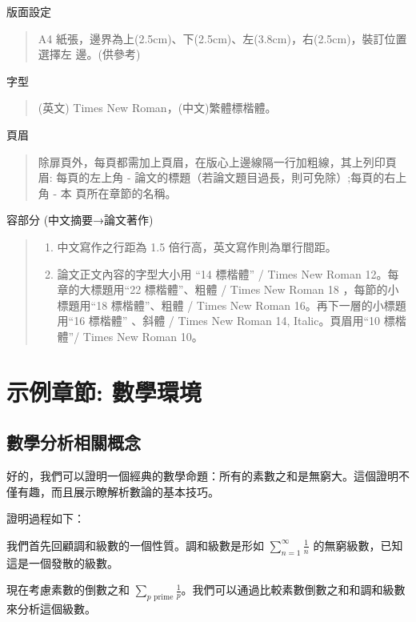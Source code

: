 \documentclass[
    writingLanguage=chinese, %
    addPageTitle=on,  %
    addDeclaration=on, %
    addMUSTlog=off, %
    addFigTOC=on, %
    addTabTOC=on, %
    refIndent=off, %
    printMod=off, %
]{.def/must}
\begin{document}
\noindent\faHandORight 版面設定
\begin{quote}
A4 紙張，邊界為上(2.5cm)、下(2.5cm)、左(3.8cm)，右(2.5cm)，裝訂位置選擇左
邊。(供參考)

\end{quote}

\noindent\faHandORight 字型
\begin{quote}
(英文) Times New Roman，(中文)繁體標楷體。
\end{quote}

\noindent\faHandORight 頁眉
\begin{quote}
除扉頁外，每頁都需加上頁眉，在版心上邊線隔一行加粗線，其上列印頁眉:
每頁的左上角 - 論文的標題（若論文題目過長，則可免除）;每頁的右上角 - 本
頁所在章節的名稱。
\end{quote}

\noindent\faHandORight 容部分 (中文摘要→論文著作)
\begin{quote}
\begin{enumerate}
    \item 中文寫作之行距為 1.5 倍行高，英文寫作則為單行間距。
    \item 論文正文內容的字型大小用 “14 標楷體” / Times New Roman 12。每章的大標題用“22 標楷體”、粗體 / Times New Roman 18 ，每節的小標題用“18 標楷體”、粗體 / Times New Roman 16。再下一層的小標題用“16 標楷體” 、斜體 / Times New Roman 14, Italic。頁眉用“10 標楷體”/ Times New Roman 10。
\end{enumerate}
\end{quote}



 



\chapter{示例章節: 數學環境}
\section{數學分析相關概念}
好的，我們可以證明一個經典的數學命題：所有的素數之和是無窮大。這個證明不僅有趣，而且展示瞭解析數論的基本技巧。

證明過程如下：

我們首先回顧調和級數的一個性質。調和級數是形如 \( \sum_{n=1}^{\infty} \frac{1}{n} \) 的無窮級數，已知這是一個發散的級數。

現在考慮素數的倒數之和 \( \sum_{p \text{ prime}} \frac{1}{p} \)。我們可以通過比較素數倒數之和和調和級數來分析這個級數。
\end{document}
